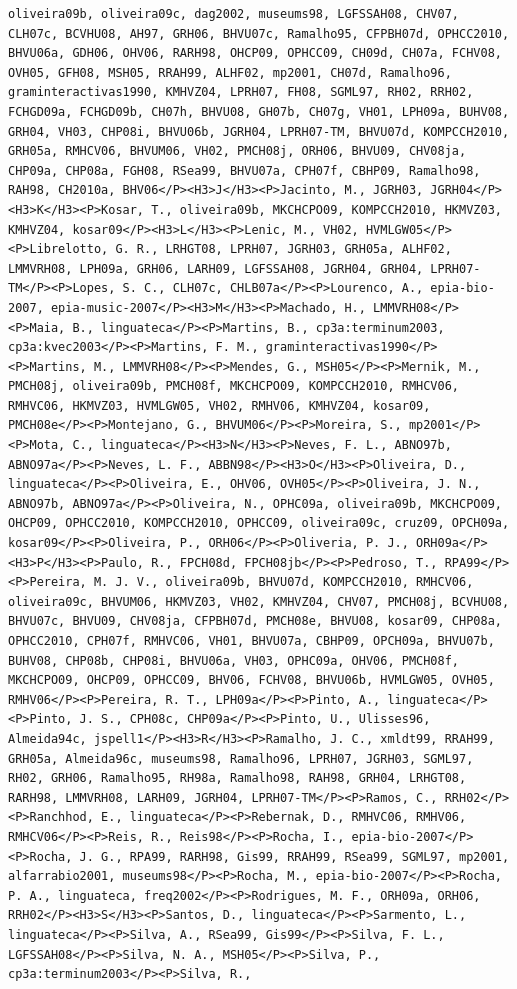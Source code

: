 \documentclass[11pt,a4paper]{report}
\begin{document}
\begin{appendices}
\begin{lstlisting}
oliveira09b, oliveira09c, dag2002, museums98, LGFSSAH08, CHV07, CLH07c, BCVHU08, AH97, GRH06, BHVU07c, Ramalho95, CFPBH07d, OPHCC2010, BHVU06a, GDH06, OHV06, RARH98, OHCP09, OPHCC09, CH09d, CH07a, FCHV08, OVH05, GFH08, MSH05, RRAH99, ALHF02, mp2001, CH07d, Ramalho96, graminteractivas1990, KMHVZ04, LPRH07, FH08, SGML97, RH02, RRH02, FCHGD09a, FCHGD09b, CH07h, BHVU08, GH07b, CH07g, VH01, LPH09a, BUHV08, GRH04, VH03, CHP08i, BHVU06b, JGRH04, LPRH07-TM, BHVU07d, KOMPCCH2010, GRH05a, RMHCV06, BHVUM06, VH02, PMCH08j, ORH06, BHVU09, CHV08ja, CHP09a, CHP08a, FGH08, RSea99, BHVU07a, CPH07f, CBHP09, Ramalho98, RAH98, CH2010a, BHV06</P><H3>J</H3><P>Jacinto, M., JGRH03, JGRH04</P><H3>K</H3><P>Kosar, T., oliveira09b, MKCHCPO09, KOMPCCH2010, HKMVZ03, KMHVZ04, kosar09</P><H3>L</H3><P>Lenic, M., VH02, HVMLGW05</P><P>Librelotto, G. R., LRHGT08, LPRH07, JGRH03, GRH05a, ALHF02, LMMVRH08, LPH09a, GRH06, LARH09, LGFSSAH08, JGRH04, GRH04, LPRH07-TM</P><P>Lopes, S. C., CLH07c, CHLB07a</P><P>Lourenco, A., epia-bio-2007, epia-music-2007</P><H3>M</H3><P>Machado, H., LMMVRH08</P><P>Maia, B., linguateca</P><P>Martins, B., cp3a:terminum2003, cp3a:kvec2003</P><P>Martins, F. M., graminteractivas1990</P><P>Martins, M., LMMVRH08</P><P>Mendes, G., MSH05</P><P>Mernik, M., PMCH08j, oliveira09b, PMCH08f, MKCHCPO09, KOMPCCH2010, RMHCV06, RMHVC06, HKMVZ03, HVMLGW05, VH02, RMHV06, KMHVZ04, kosar09, PMCH08e</P><P>Montejano, G., BHVUM06</P><P>Moreira, S., mp2001</P><P>Mota, C., linguateca</P><H3>N</H3><P>Neves, F. L., ABNO97b, ABNO97a</P><P>Neves, L. F., ABBN98</P><H3>O</H3><P>Oliveira, D., linguateca</P><P>Oliveira, E., OHV06, OVH05</P><P>Oliveira, J. N., ABNO97b, ABNO97a</P><P>Oliveira, N., OPHC09a, oliveira09b, MKCHCPO09, OHCP09, OPHCC2010, KOMPCCH2010, OPHCC09, oliveira09c, cruz09, OPCH09a, kosar09</P><P>Oliveira, P., ORH06</P><P>Oliveria, P. J., ORH09a</P><H3>P</H3><P>Paulo, R., FPCH08d, FPCH08jb</P><P>Pedroso, T., RPA99</P><P>Pereira, M. J. V., oliveira09b, BHVU07d, KOMPCCH2010, RMHCV06, oliveira09c, BHVUM06, HKMVZ03, VH02, KMHVZ04, CHV07, PMCH08j, BCVHU08, BHVU07c, BHVU09, CHV08ja, CFPBH07d, PMCH08e, BHVU08, kosar09, CHP08a, OPHCC2010, CPH07f, RMHVC06, VH01, BHVU07a, CBHP09, OPCH09a, BHVU07b, BUHV08, CHP08b, CHP08i, BHVU06a, VH03, OPHC09a, OHV06, PMCH08f, MKCHCPO09, OHCP09, OPHCC09, BHV06, FCHV08, BHVU06b, HVMLGW05, OVH05, RMHV06</P><P>Pereira, R. T., LPH09a</P><P>Pinto, A., linguateca</P><P>Pinto, J. S., CPH08c, CHP09a</P><P>Pinto, U., Ulisses96, Almeida94c, jspell1</P><H3>R</H3><P>Ramalho, J. C., xmldt99, RRAH99, GRH05a, Almeida96c, museums98, Ramalho96, LPRH07, JGRH03, SGML97, RH02, GRH06, Ramalho95, RH98a, Ramalho98, RAH98, GRH04, LRHGT08, RARH98, LMMVRH08, LARH09, JGRH04, LPRH07-TM</P><P>Ramos, C., RRH02</P><P>Ranchhod, E., linguateca</P><P>Rebernak, D., RMHVC06, RMHV06, RMHCV06</P><P>Reis, R., Reis98</P><P>Rocha, I., epia-bio-2007</P><P>Rocha, J. G., RPA99, RARH98, Gis99, RRAH99, RSea99, SGML97, mp2001, alfarrabio2001, museums98</P><P>Rocha, M., epia-bio-2007</P><P>Rocha, P. A., linguateca, freq2002</P><P>Rodrigues, M. F., ORH09a, ORH06, RRH02</P><H3>S</H3><P>Santos, D., linguateca</P><P>Sarmento, L., linguateca</P><P>Silva, A., RSea99, Gis99</P><P>Silva, F. L., LGFSSAH08</P><P>Silva, N. A., MSH05</P><P>Silva, P., cp3a:terminum2003</P><P>Silva, R., 
\end{lstlisting}
\end{appendices}
\end{document}
